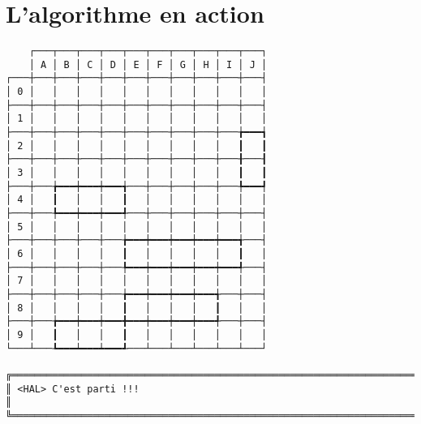 \chapter{L'algorithme en action} \label{annexe_algo_action}
{\scriptsize
\begin{verbatim}
    ┌───┬───┬───┬───┬───┬───┬───┬───┬───┬───┐
    │ A │ B │ C │ D │ E │ F │ G │ H │ I │ J │
┌───┼───┼───┼───┼───┼───┼───┼───┼───┼───┼───┤
│ 0 │   │   │   │   │   │   │   │   │   │   │
├───┼───┼───┼───┼───┼───┼───┼───┼───┼───┼───┤
│ 1 │   │   │   │   │   │   │   │   │   │   │
├───┼───┼───┼───┼───┼───┼───┼───┼───┼───╆━━━┪
│ 2 │   │   │   │   │   │   │   │   │   ┃   ┃
├───┼───┼───┼───┼───┼───┼───┼───┼───┼───╂───┨
│ 3 │   │   │   │   │   │   │   │   │   ┃   ┃
├───┼───╆━━━┿━━━┿━━━╅───┼───┼───┼───┼───╄━━━┩
│ 4 │   ┃   │   │   ┃   │   │   │   │   │   │
├───┼───╄━━━┿━━━┿━━━╃───┼───┼───┼───┼───┼───┤
│ 5 │   │   │   │   │   │   │   │   │   │   │
├───┼───┼───┼───┼───╆━━━┿━━━┿━━━┿━━━┿━━━╅───┤
│ 6 │   │   │   │   ┃   │   │   │   │   ┃   │
├───┼───┼───┼───┼───╄━━━┿━━━┿━━━┿━━━┿━━━╃───┤
│ 7 │   │   │   │   │   │   │   │   │   │   │
├───┼───┼───┼───┼───╆━━━┿━━━┿━━━┿━━━╅───┼───┤
│ 8 │   │   │   │   ┃   │   │   │   ┃   │   │
├───┼───╆━━━┿━━━┿━━━╋━━━┿━━━┿━━━┿━━━╃───┼───┤
│ 9 │   ┃   │   │   ┃   │   │   │   │   │   │
└───┴───┺━━━┷━━━┷━━━┹───┴───┴───┴───┴───┴───┘

╔══════════════════════════════════════════════════════════════════════════════════════════════════╗
║ <HAL> C'est parti !!!                                                                            ║
╚══════════════════════════════════════════════════════════════════════════════════════════════════╝
\end{verbatim}}
\newpage

